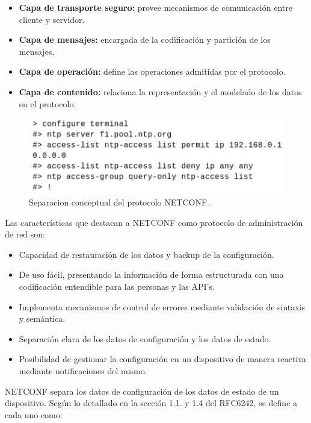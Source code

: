 \begin{itemize}
	\item \textbf{Capa de transporte seguro:} provee mecanismos de comunicación entre cliente y servidor.  
	\item \textbf{Capa de mensajes:} encargada de la codificación y partición de los mensajes.  
	\item \textbf{Capa de operación:} define las operaciones admitidas por el protocolo.
	\item \textbf{Capa de contenido:} relaciona la representación y el modelado de los datos en el protocolo.    
\end{itemize}

\begin{figure}[htbp]
	\centering
	\includegraphics[scale=0.6]{Figures/cli.pdf}
	\caption{Separacion conceptual del protocolo NETCONF.}
	\label{fig:netconf}
  \end{figure}


  Las características que destacan a NETCONF como protocolo de administración de red son:

  \begin{itemize}
	\item Capacidad de restauración de los datos y backup de la configuración.
	\item De uso fácil, presentando la información de forma estructurada con una codificación entendible para las personas y las API’s.
	\item Implementa mecanismos de control de errores mediante validación de sintaxis y semántica.
	\item Separación clara de los datos de configuración y los datos de estado.
	\item Posibilidad de gestionar la configuración en un dispositivo de manera reactiva mediante notificaciones del mismo.
\end{itemize}

NETCONF separa los datos de configuración de los datos de estado de un dispositivo. Según lo detallado en la sección 1.1. y 1.4 del RFC6242, se define a cada uno como:

